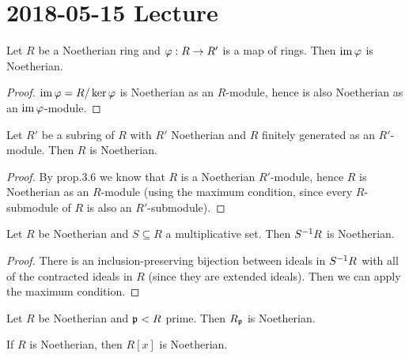 \section{2018-05-15 Lecture}

\begin{prop}[3.13]
  Let $R$ be a Noetherian ring and $\varphi: R \to R'$ is a map of rings.
  Then $\operatorname{im}\varphi$ is Noetherian.
\end{prop}

\begin{proof}
  $\operatorname{im}\varphi = R/\ker\varphi$ is Noetherian as an $R$-module, hence is also Noetherian as an $\operatorname{im}\varphi$-module.
\end{proof}

\begin{prop}[3.14]
  Let $R'$ be a subring of $R$ with $R'$ Noetherian and $R$ finitely generated as an $R'$-module.
  Then $R$ is Noetherian.
\end{prop}

\begin{proof}
  By prop.\@ 3.6 we know that $R$ is a Noetherian $R'$-module, hence $R$ is Noetherian as an $R$-module (using the maximum condition, since every $R$-submodule of $R$ is also an $R'$-submodule).
\end{proof}

\begin{prop}
  Let $R$ be Noetherian and $S \subseteq R$ a multiplicative set.
  Then $S^{-1} R$ is Noetherian.
\end{prop}

\begin{proof}
  There is an inclusion-preserving bijection between ideals in $S^{-1} R$ with all of the contracted ideals in $R$ (since they are extended ideals).
  Then we can apply the maximum condition.
\end{proof}

\begin{cor}[3.16]
  Let $R$ be Noetherian and $\mathfrak{p}<R$ prime.
  Then $R_{\mathfrak{p}}$ is Noetherian.
\end{cor}

\begin{thm}
  If $R$ is Noetherian, then $R[x]$ is Noetherian.
\end{thm}

